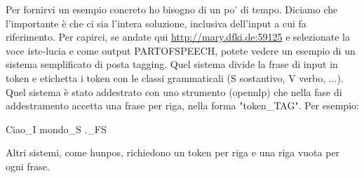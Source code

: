 \documentclass[11pt,a4paper]{article}
\begin{document}
\begin{itemize}
	Per fornirvi un esempio concreto ho bisogno di un po' di tempo.
Diciamo che l'importante è che ci sia l'intera soluzione, inclusiva dell'input a cui fa riferimento.
Per capirci, se andate qui \url{http://mary.dfki.de:59125} e selezionate la voce istc-lucia e come output PARTOFSPEECH, potete vedere un esempio di un sistema semplificato di posta tagging. Quel sistema divide la frase di input in token e etichetta i token con le classi grammaticali (S sostantivo, V verbo, ...). Quel sistema è stato addestrato con uno strumento (opennlp) che nella fase di addestramento accetta una frase per riga, nella forma "token\_TAG". Per esempio:

Ciao\_I mondo\_S .\_FS

Altri sistemi, come hunpos, richiedono un token per riga e una riga vuota per ogni frase.		
	\end{itemize}
\end{document}
